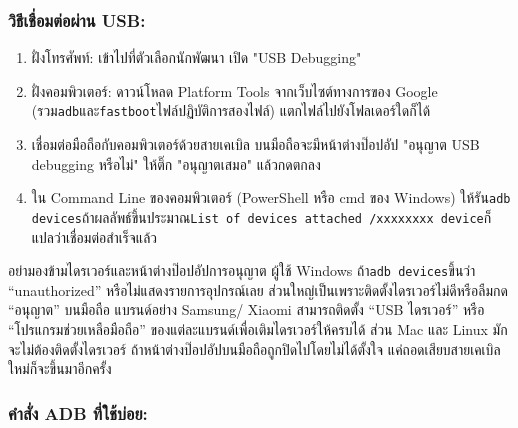 \subsubsection*{วิธีเชื่อมต่อผ่าน USB:}

\begin{enumerate}
  \item ฝั่งโทรศัพท์: เข้าไปที่ตัวเลือกนักพัฒนา เปิด "USB Debugging"
  \item ฝั่งคอมพิวเตอร์: ดาวน์โหลด Platform Tools จากเว็บไซต์ทางการของ Google (รวม\texttt{adb}และ\texttt{fastboot}ไฟล์ปฏิบัติการสองไฟล์) แตกไฟล์ไปยังโฟลเดอร์ใดก็ได้
  \item เชื่อมต่อมือถือกับคอมพิวเตอร์ด้วยสายเคเบิล บนมือถือจะมีหน้าต่างป๊อปอัป "อนุญาต USB debugging หรือไม่" ให้ติ๊ก "อนุญาตเสมอ" แล้วกดตกลง
  \item ใน Command Line ของคอมพิวเตอร์ (PowerShell หรือ cmd ของ Windows) ให้รัน\texttt{adb devices}ถ้าผลลัพธ์ขึ้นประมาณ\texttt{List of devices attached /\allowbreak  xxxxxxxx device}ก็แปลว่าเชื่อมต่อสำเร็จแล้ว
\end{enumerate}

\begin{tcbwarn}{อย่ามองข้ามไดรเวอร์และหน้าต่างป๊อปอัปการอนุญาต}
ผู้ใช้ Windows ถ้า\texttt{adb devices}ขึ้นว่า “unauthorized” หรือไม่แสดงรายการอุปกรณ์เลย ส่วนใหญ่เป็นเพราะติดตั้งไดรเวอร์ไม่ดีหรือลืมกด “อนุญาต” บนมือถือ แบรนด์อย่าง Samsung/ Xiaomi สามารถติดตั้ง “USB ไดรเวอร์” หรือ “โปรแกรมช่วยเหลือมือถือ” ของแต่ละแบรนด์เพื่อเติมไดรเวอร์ให้ครบได้ ส่วน Mac และ Linux มักจะไม่ต้องติดตั้งไดรเวอร์ ถ้าหน้าต่างป๊อปอัปบนมือถือถูกปิดไปโดยไม่ได้ตั้งใจ แค่ถอดเสียบสายเคเบิลใหม่ก็จะขึ้นมาอีกครั้ง

\end{tcbwarn}

\subsubsection*{คำสั่ง ADB ที่ใช้บ่อย:}

